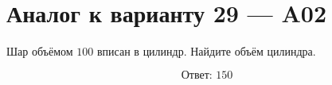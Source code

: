 \documentclass[12pt,a4paper]{article}
\begin{document}
\section*{Аналог к варианту 29 — A02}

Шар объёмом \(100\) вписан в цилиндр. Найдите объём цилиндра.

\begin{center}
\end{center}

\[
\boxed{\text{Ответ: }150}
\]
\end{document}
